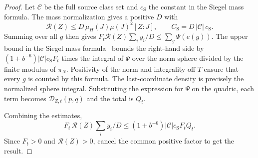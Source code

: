 \begin{proof}
Let $\mathcal C$ be the full source class set and $c_{\mathrm S}$ the constant in the Siegel mass formula.
The mass normalization gives a positive $D$ with
\[
 \mathcal R(Z)\le D\,\mu_H(J)\mu(J)^2[Z:J],
 \qquad C_{\mathrm S}=D\,|\mathcal C|\,c_{\mathrm S}.
\]
Summing over all $g$ then gives
$F_t\mathcal R(Z)\sum_i y_i/D\le\sum_g\Psi(e(g))$.
The upper bound in the Siegel mass formula~\cite{Siegel1935} bounds the right-hand side by
$(1+b^{-6})|\mathcal C|c_{\mathrm S}F_t$
times the integral of $\Psi$ over the norm sphere divided by the finite modulus of $\pi_N$.
Positivity of the norm and integrality off $T$ ensure that every $g$ is counted by this formula.
The last-coordinate density is precisely the normalized sphere integral.
Substituting the expression for $\Psi$ on the quadric,
each term becomes $\mathcal D_{Z,t}(p,q)$ and the total is $Q_t$.

Combining the estimates,
\[
 F_t\,\mathcal R(Z)\sum_i y_i/D
 \le (1+b^{-6})|\mathcal C|c_{\mathrm S}F_t Q_t .
\]
Since $F_t>0$ and $\mathcal R(Z)>0$, cancel the common positive factor to get the result.
\end{proof}

